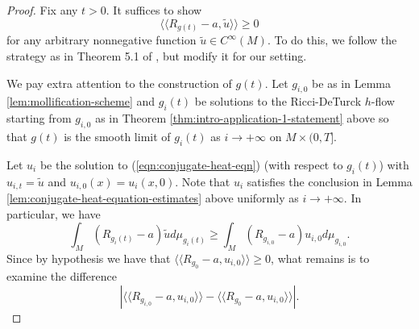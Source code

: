 \documentclass[12pt]{amsart}
\theoremstyle{plain}
\theoremstyle{plain}
\theoremstyle{definition}
\theoremstyle{remark}
\numberwithin{equation}{subsection}
\begin{document}
\begin{proof}
Fix any $t>0$. It suffices to show
    \begin{equation*}
        \langle    \langle  R_{g(t)}-a, \tilde u \rangle \rangle \geq 0
    \end{equation*}
    for any arbitrary nonnegative function $\tilde{u}\in C^\infty(M)$. To do this, we follow the strategy as in Theorem 5.1 of \cite{jiang_weak_2021}, but modify it for our setting. 
    
We pay extra attention to the construction of $g(t)$.  Let $g_{i,0}$ be as in Lemma \ref{lem:mollification-scheme} and $g_i(t)$ be solutions to the Ricci-DeTurck $h$-flow starting from $g_{i,0}$ as in Theorem \ref{thm:intro-application-1-statement} above so that $g(t)$ is the smooth limit of $g_i(t)$ as $i\to+\infty$ on $M\times (0,T]$.


Let $u_i$ be the solution to (\ref{eqn:conjugate-heat-eqn}) (with respect to $g_i(t)$) with $u_{i,t} = \tilde{u}$ and $u_{i,0}(x) = u_i(x,0)$. Note that $u_i$ satisfies the conclusion in Lemma \ref{lem:conjugate-heat-equation-estimates} above uniformly as $i\to+\infty$. In particular, we have
    \begin{equation}\label{eqn:scalar-monotonicity}
        \int_M (R_{g_i(t)}-a)\tilde{u}d\mu_{g_i(t)} \geq \int_M (R_{g_{i,0}}-a)u_{i,0}d\mu_{g_{i,0}}.
    \end{equation}
    Since by hypothesis we have that $\langle\langle R_{g_0} - a,u_{i,0}\rangle\rangle \geq 0$, what remains is to examine the difference
    \begin{equation*}
        \left|\langle \langle R_{g_{i,0}}-a, u_{i,0}\rangle \rangle - \langle\langle R_{g_0} - a, u_{i,0}\rangle\rangle \right|.
    \end{equation*}


\end{proof}
\end{document}
